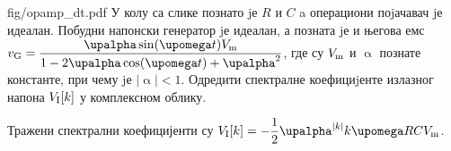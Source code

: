 \begin{slikaDesno}[.833]{fig/opamp_dt.pdf}
    \PID 
    У колу са слике познато jе $R$ и $C$ a операциони поjачавач jе идеалан. 
    Побудни напонски генератор jе идеалан, а позната jе и његова
    емс 
    $v_{\rm G} = \dfrac{\upalpha \sin(\upomega t) V_{\rm m} }{1 - 2\upalpha \cos(\upomega t) + \upalpha^2}$, 
    где су $V_{\rm m}$ и $\upalpha$ познате константе, при
    чему jе $|\upalpha| < 1$. Одредити спектралне коефициjенте излазног напона 
    $V_{\rm I} [k]$ у комплексном облику.
\end{slikaDesno}

\REZULTAT 
Тражени спектрални коефицијенти су 
$V_{\rm I}[k] = - \dfrac{1}{2} \upalpha^{|k|} k \upomega R C V_{\rm m}$.